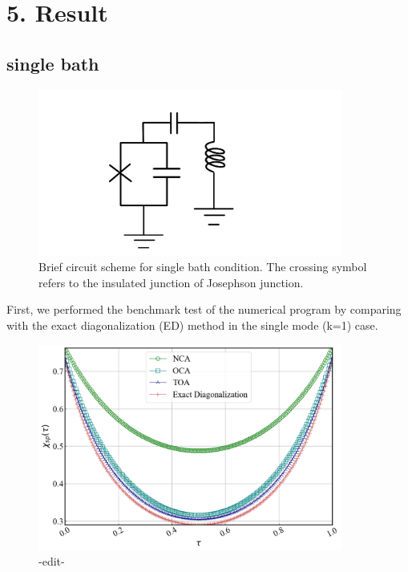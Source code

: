 \documentclass{article}[12pt]
\begin{document}
\section*{5. Result}

\begin{spacing}{1.5}

\subsection*{single bath}

\begin{figure}[htbp]
  \centerline{\includegraphics[width=10cm]{TexFigure/kps_singlebath.png}}
  \caption{Brief circuit scheme for single bath condition. The crossing symbol  refers to the insulated junction of Josephson junction.}
\end{figure}
First, we performed the benchmark test of the numerical program by comparing with the exact diagonalization (ED) method in the single mode (k=1) case.
\begin{figure}[htbp]
  \centerline{\includegraphics[width=10cm]{TexFigure/Res_bench_Fig1.png}}
  \caption{-edit-}
\end{figure}

\end{spacing}

\pagebreak
\newpage
\end{document}
